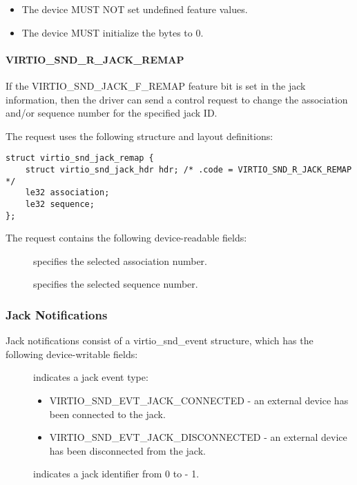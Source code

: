 
\begin{itemize}
\item The device MUST NOT set undefined feature values.
\item The device MUST initialize the  bytes to 0.
\end{itemize}

\paragraph{VIRTIO_SND_R_JACK_REMAP}

If the VIRTIO_SND_JACK_F_REMAP feature bit is set in the jack information,
then the driver can send a control request to change the association and/or
sequence number for the specified jack ID.

The request uses the following structure and layout definitions:

\begin{lstlisting}
struct virtio_snd_jack_remap {
    struct virtio_snd_jack_hdr hdr; /* .code = VIRTIO_SND_R_JACK_REMAP */
    le32 association;
    le32 sequence;
};
\end{lstlisting}

The request contains the following device-readable fields:

\begin{description}
\item[] specifies the selected association number.
\item[] specifies the selected sequence number.
\end{description}

\subsubsection{Jack Notifications}

Jack notifications consist of a virtio_snd_event structure, which has the following
device-writable fields:

\begin{description}
\item[] indicates a jack event type:
\begin{itemize}
\item VIRTIO_SND_EVT_JACK_CONNECTED - an external device has been connected to the jack.
\item VIRTIO_SND_EVT_JACK_DISCONNECTED - an external device has been disconnected from the jack.
\end{itemize}
\item[] indicates a jack identifier from 0 to  - 1.
\end{description}

